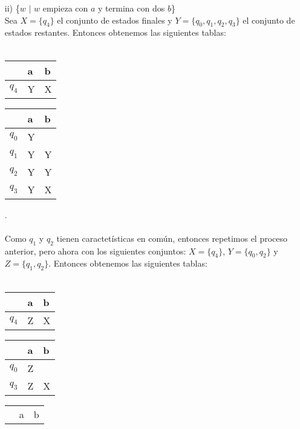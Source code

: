 \documentclass[letterpaper,11pt]{article}
\begin{document}
\begin{enumerate}
\begin{itemize}
     \item[ii)] \{$w$ $|$ $w$ empieza con $a$ y termina con dos $b$\} \\
     Sea $X = \{q_4\}$ el conjunto de estados finales y 
     $Y = \{q_0, q_1, q_2, q_3\}$ el conjunto de estados restantes. Entonces
     obtenemos las siguientes tablas:\\ \\
     \begin{center}
    \begin{tabular}{||l | l | l||}
    \hline
    \hline
     & a & b \\
     \hline
     $q_4$ & Y & X\\
     \hline
     \end{tabular}
     \begin{tabular}{||l | l | l||}
    \hline
    \hline
     & a & b \\
     \hline
     $q_0$ & Y & \\
     \hline
     $q_1$ & Y & Y \\
     \hline
     $q_2$ & Y & Y\\
     \hline
     $q_3$ & Y & X\\
     \hline
     \end{tabular}
     \end{center}
     . \\ \\
     Como $q_1$ y $q_2$ tienen caractetísticas en común, entonces repetimos
     el proceso anterior, pero ahora con los siguientes conjuntos:
     $X = \{q_4\}$, $Y = \{q_0, q_2\}$ y $Z = \{q_1, q_2\}$. Entonces obtenemos
     las siguientes tablas:\\ \\
     \begin{center}
    \begin{tabular}{||l | l | l||}
    \hline
    \hline
     & a & b \\
     \hline
     $q_4$ & Z & X\\
     \hline
     \end{tabular}
     \begin{tabular}{||l | l | l||}
    \hline
    \hline
     & a & b \\
     \hline
     $q_0$ & Z & \\
     \hline
     $q_3$ & Z & X \\
     \hline
     \end{tabular}
     \begin{tabular}{||l | l | l||}
    \hline
    \hline
     & a & b \\

\end{tabular}
\end{center}
\end{itemize}
\end{enumerate}
\end{document}

